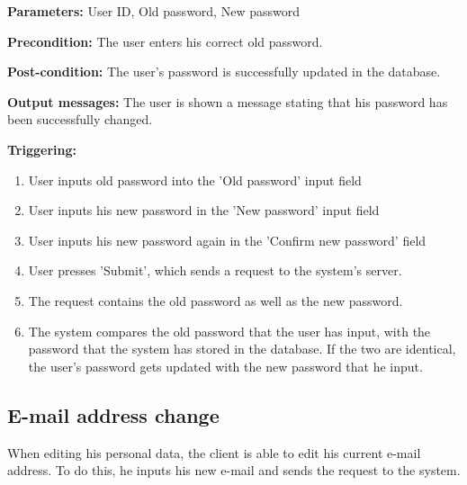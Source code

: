 \begin{description}

\item \textbf{Parameters:} User ID, Old password, New password

\item \textbf{Precondition:} The user enters his correct old password.

\item \textbf{Post-condition:} The user's password is successfully updated in
the database.

\item \textbf{Output messages:} The user is shown a message stating that his
password has been successfully changed.

\item \textbf{Triggering:}
\begin{enumerate}
\item User inputs old password into the 'Old password' input field

\item User inputs his new password in the 'New password' input field

\item User inputs his new password again in the 'Confirm new password' field

\item User presses 'Submit', which sends a request to the system's server.

\item The request contains the old password as well as the new password.

\item The system compares the old password that the user has input, with the
password that the system has stored in the database. If the two are identical,
the user's password gets updated with the new password that he input.

\end{enumerate}

\end{description}

\subsection{E-mail address change}

 When editing his personal data, the client is able to edit his current e-mail
 address.
 To do this, he inputs his new e-mail and sends the request to the system.
 
